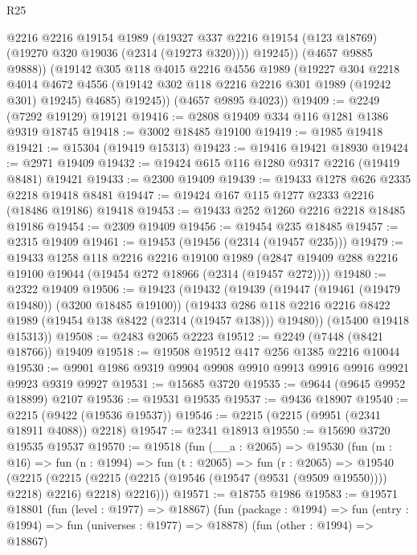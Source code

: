\begin{lexlean}{R25}
\begin{coremodule}
              @2216
              @2216
              @19154
              @1989
              (@19327 @337 @2216 @19154 (@123 @18769) (@19270 @320 @19036 (@2314 (@19273 @320))))
              @19245))
          (@4657 @9885 @9888))
        (@19142
          @305
          @118
          @4015
          @2216
          @4556
          @1989
          (@19227
            @304
            @2218
            @4014
            @4672
            @4556
            (@19142 @302 @118 @2216 @2216 @301 @1989 (@19242 @301) @19245)
            @4685)
          @19245))
      (@4657 @9895 @4023))
@19409 := @2249 (@7292 @19129) @19121
@19416 := @2808 @19409 @334 @116 @1281 @1386 @9319 @18745
@19418 := @3002 @18485 @19100
@19419 := @1985 @19418
@19421 := @15304 (@19419 @15313)
@19423 := @19416 @19421 @18930
@19424 := @2971 @19409
@19432 := @19424 @615 @116 @1280 @9317 @2216 (@19419 @8481) @19421
@19433 := @2300 @19409
@19439 := @19433 @1278 @626 @2335 @2218 @19418 @8481
@19447 := @19424 @167 @115 @1277 @2333 @2216 (@18486 @19186) @19418
@19453 := @19433 @252 @1260 @2216 @2218 @18485 @19186
@19454 := @2309 @19409
@19456 := @19454 @235 @18485
@19457 := @2315 @19409
@19461 := @19453 (@19456 (@2314 (@19457 @235)))
@19479 := @19433
    @1258
    @118
    @2216
    @2216
    @19100
    @1989
    (@2847 @19409 @288 @2216 @19100 @19044 (@19454 @272 @18966 (@2314 (@19457 @272))))
@19480 := @2322 @19409
@19506 := @19423
    (@19432
      (@19439
        (@19447 (@19461 (@19479 @19480)) (@3200 @18485 @19100))
        (@19433 @286 @118 @2216 @2216 @8422 @1989 (@19454 @138 @8422 (@2314 (@19457 @138))) @19480))
      (@15400 @19418 @15313))
@19508 := @2483 @2065 @2223
@19512 := @2249 (@7448 (@8421 @18766)) @19409
@19518 := @19508 @19512 @417 @256 @1385 @2216 @10044
@19530 := @9901 @1986 @9319 @9904 @9908 @9910 @9913 @9916 @9916 @9921 @9923 @9319 @9927
@19531 := @15685 @3720
@19535 := @9644 (@9645 @9952 @18899) @2107
@19536 := @19531 @19535
@19537 := @9436 @18907
@19540 := @2215 (@9422 (@19536 @19537))
@19546 := @2215 (@2215 (@9951 (@2341 @18911 @4088)) @2218)
@19547 := @2341 @18913
@19550 := @15690 @3720 @19535 @19537
@19570 := @19518
    (fun (__a : @2065) =>
    @19530
      (fun (m : @16) =>
      fun (n : @1994) =>
      fun (t : @2065) =>
      fun (r : @2065) =>
      @19540
        (@2215
          (@2215 (@2215 (@2215 (@19546 (@19547 (@9531 (@9509 @19550)))) @2218) @2216) @2218)
          @2216)))
@19571 := @18755 @1986
@19583 := @19571
    @18801
    (fun (level : @1977) => @18867)
    (fun (package : @1994) => fun (entry : @1994) => fun (universes : @1977) => @18878)
    (fun (other : @1994) => @18867)

\end{coremodule}
\end{lexlean}

